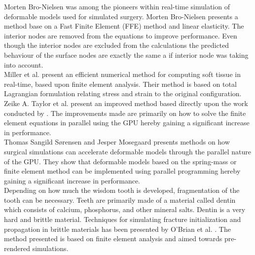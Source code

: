 Morten Bro-Nielsen was among the pioneers
within real-time simulation of deformable models used for simulated
surgery. Morten Bro-Nielsen
 presents a 
method base on a Fast Finite Element (FFE) method and linear
elasticity. The interior nodes
are removed from the equations to improve performance. Even though the
interior nodes are excluded from the calculations the predicted
behaviour of the surface nodes are exactly the same a if interior node
was taking into account. \\

Miller et al.  present an efficient numerical
method for computing soft tissue in real-time, based upon finite
element analysis. Their method is based on total Lagrangian
formulation relating stress and strain to the original configuration. \\

Zeike A. Taylor et al.  present an improved method
based directly upon the work conducted by .
The improvements made are primarily on how to solve the finite element
equations in parallel using the GPU hereby gaining a significant
increase in performance. \\

Thomas Sangild Sørensen and Jesper Mosegaard presents methods on
how surgical simulations can accelerate deformable models through
the parallel nature of the GPU. They show
that deformable models based on the spring-mass or finite element
method can be implemented using parallel programming hereby gaining a
significant increase in performance. \\


Depending on how much the wisdom tooth is developed, fragmentation of
the tooth can be necessary. Teeth are primarily made of a material
called dentin which consists of calcium, phosphorus, and other
mineral salts. Dentin is a very hard and brittle material.
Techniques for simulating fracture initialization and
propagation in brittle materials has been presented by O'Brian
et al. . The method presented is based on
finite element analysis and aimed towards pre-rendered simulations. \\

